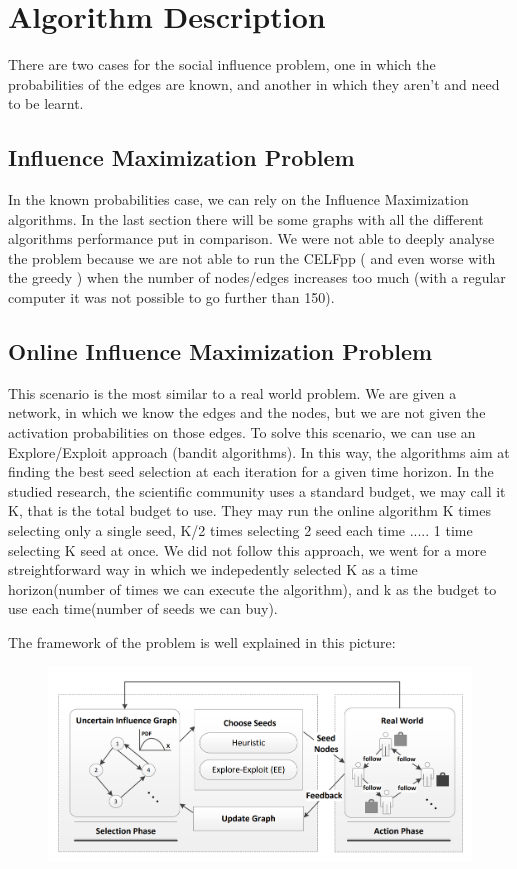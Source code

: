 \newpage
\section{Algorithm Description}


There are two cases for the social influence problem, one in which the probabilities of the edges are known, and another in which they aren't and need to be learnt.

\subsection{Influence Maximization Problem}

In the known probabilities case, we can rely on the Influence Maximization algorithms.
In the last section there will be some graphs with all the different algorithms performance put in comparison.
We were not able to deeply analyse the problem because we are not able to run the CELFpp ( and even worse with the greedy ) when the number of nodes/edges increases too much (with a regular computer it was not possible to go further than 150).

\subsection{Online Influence Maximization Problem}

This scenario is the most similar to a real world problem.
We are given a network, in which we know the edges and the nodes, but we are not given the activation probabilities on those edges.
To solve this scenario, we can use an Explore/Exploit approach (bandit algorithms).
In this way, the algorithms aim at finding the best seed selection at each iteration for a given time horizon.
In the studied research, the scientific community uses a standard budget, we may call it K, that is the total budget to use.
They may run the online algorithm K times selecting only a single seed, K/2 times selecting 2 seed each time ..... 1 time selecting K seed at once.
We did not follow this approach, we went for a more streightforward way in which we indepedently selected K as a time horizon(number of times we can execute the algorithm), and k as the budget to use each time(number of seeds we can buy).

The framework of the problem is well explained in this picture:

\begin{figure}[H]
	\centering
	\includegraphics[scale=1]{img/IMG3}
\end{figure}

